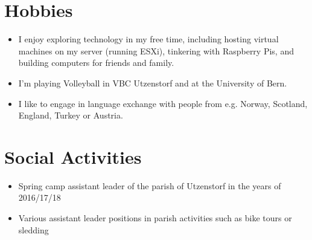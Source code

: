 \documentclass{article}
\begin{document}
\section{Hobbies}
\begin{itemize}
    \item I enjoy exploring technology in my free time, 
    including hosting virtual machines on my server (running ESXi), tinkering with Raspberry Pis, 
    and building computers for friends and family.
    \item I'm playing Volleyball in VBC Utzenstorf and at the University of Bern.
    \item I like to engage in language exchange with people from e.g. 
    Norway, Scotland, England, Turkey or Austria.
\end{itemize}

\section{Social Activities}
\begin{itemize}
    \item Spring camp assistant leader of the parish of Utzenstorf in the years of 2016/17/18
    \item Various assistant leader positions in parish activities such as bike tours or sledding
\end{itemize}
\end{document}
